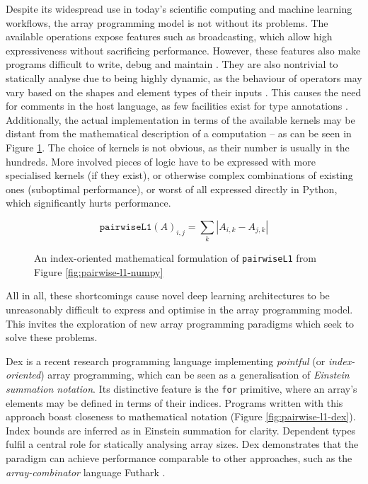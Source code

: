Despite its widespread use in today's scientific computing and machine learning workflows, the array programming model is not without its problems. The available operations expose features such as broadcasting, which allow high expressiveness without sacrificing performance. However, these features also make programs difficult to write, debug and maintain \cite{paszke2021getting}. They are also nontrivial to statically analyse due to being highly dynamic, as the behaviour of operators may vary based on the shapes and element types of their inputs . This causes the need for comments in the host language, as few facilities exist for type annotations . Additionally, the actual implementation in terms of the available kernels may be distant from the mathematical description of a computation -- as can be seen in Figure \ref{fig:pairwise-l1-math}. The choice of kernels is not obvious, as their number is usually in the hundreds. More involved pieces of logic have to be expressed with more specialised kernels (if they exist), or otherwise complex  combinations of existing ones (suboptimal performance), or worst of all expressed directly in Python, which significantly hurts performance.

\begin{figure}[h]
    \centering
    $$ \texttt{pairwiseL1}(A)_{i,j} = \sum_{k} \left| A_{i,k} - A_{j,k} \right|  $$
    \caption{An index-oriented mathematical formulation of \texttt{pairwiseL1} from Figure \ref{fig:pairwise-l1-numpy}}
    \label{fig:pairwise-l1-math}
\end{figure}

All in all, these shortcomings cause novel deep learning architectures to be unreasonably difficult to express and optimise in the array programming model. This invites the exploration of new array programming paradigms which seek to solve these problems.

Dex \cite{paszke2021getting} is a recent research programming language implementing \textit{pointful} (or \textit{index-oriented}) array programming, which can be seen as a generalisation of \textit{Einstein summation notation}. Its distinctive feature is the \texttt{for} primitive, where an array's elements may be defined in terms of their indices. Programs written with this approach boast closeness to mathematical notation (Figure \ref{fig:pairwise-l1-dex}). Index bounds are inferred as in Einstein summation for clarity. Dependent types fulfil a central role for statically analysing array sizes. Dex demonstrates that the paradigm can achieve performance comparable to other approaches, such as the \textit{array-combinator} language Futhark \cite{henriksen2017futhark}.

